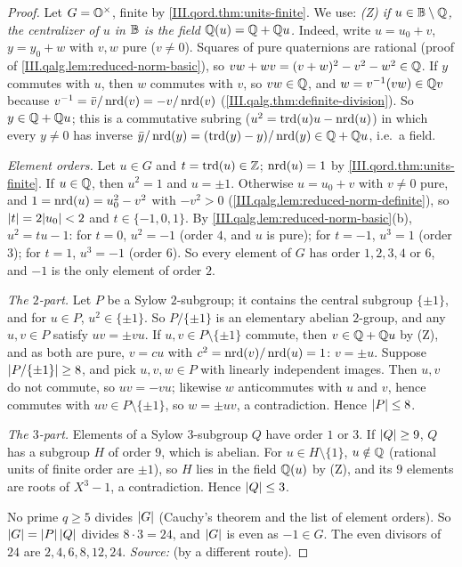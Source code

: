 \begin{theorem}
\end{theorem}
\begin{proof}
Let $G=\mathbb{O}^\times$, finite by \cref{III.qord.thm:units-finite}. We use: \emph{(Z) if $u\in\mathbb{B}\setminus\mathbb{Q}$, the centralizer of $u$ in $\mathbb{B}$ is the field
$\mathbb{Q}(u)=\mathbb{Q}+\mathbb{Q} u$.} Indeed, write $u=u_0+v$, $y=y_0+w$ with $v,w$ pure ($v\ne0$). Squares of pure quaternions are rational (proof of
\cref{III.qalg.lem:reduced-norm-basic}), so $vw+wv=(v+w)^2-v^2-w^2\in\mathbb{Q}$. If $y$ commutes with $u$, then $w$ commutes with $v$, so $vw\in\mathbb{Q}$, and
$w=v^{-1}(vw)\in\mathbb{Q} v$ because $v^{-1}=\bar v/\operatorname{nrd}(v)=-v/\operatorname{nrd}(v)$ (\cref{III.qalg.thm:definite-division}). So $y\in\mathbb{Q}+\mathbb{Q} u$; this is a commutative subring
($u^2=\operatorname{trd}(u)u-\operatorname{nrd}(u)$) in which every $y\ne0$ has inverse $\bar y/\operatorname{nrd}(y)=(\operatorname{trd}(y)-y)/\operatorname{nrd}(y)\in\mathbb{Q}+\mathbb{Q} u$, i.e.\ a field.

\emph{Element orders.} Let $u\in G$ and $t=\operatorname{trd}(u)\in\mathbb{Z}$; $\operatorname{nrd}(u)=1$ by \cref{III.qord.thm:units-finite}. If $u\in\mathbb{Q}$, then $u^2=1$ and $u=\pm1$.
Otherwise $u=u_0+v$ with $v\ne0$ pure, and $1=\operatorname{nrd}(u)=u_0^2-v^2$ with $-v^2>0$ (\cref{III.qalg.lem:reduced-norm-definite}), so $\lvert t\rvert=2\lvert u_0\rvert<2$ and
$t\in\{-1,0,1\}$. By \cref{III.qalg.lem:reduced-norm-basic}(b), $u^2=tu-1$: for $t=0$, $u^2=-1$ (order $4$, and $u$ is pure); for $t=-1$, $u^3=1$ (order
$3$); for $t=1$, $u^3=-1$ (order $6$). So every element of $G$ has order $1,2,3,4$ or $6$, and $-1$ is the only element of order $2$.

\emph{The $2$-part.} Let $P$ be a Sylow $2$-subgroup; it contains the central subgroup $\{\pm1\}$, and for $u\in P$, $u^2\in\{\pm1\}$. So $P/\{\pm1\}$ is
an elementary abelian $2$-group, and any $u,v\in P$ satisfy $uv=\pm vu$. If $u,v\in P\setminus\{\pm1\}$ commute, then $v\in\mathbb{Q}+\mathbb{Q} u$ by (Z), and as both are
pure, $v=cu$ with $c^2=\operatorname{nrd}(v)/\operatorname{nrd}(u)=1$: $v=\pm u$. Suppose $\lvert P/\{\pm1\}\rvert\ge8$, and pick $u,v,w\in P$ with linearly independent images. Then
$u,v$ do not commute, so $uv=-vu$; likewise $w$ anticommutes with $u$ and $v$, hence commutes with $uv\in P\setminus\{\pm1\}$, so $w=\pm uv$, a
contradiction. Hence $\lvert P\rvert\le8$.

\emph{The $3$-part.} Elements of a Sylow $3$-subgroup $Q$ have order $1$ or $3$. If $\lvert Q\rvert\ge9$, $Q$ has a subgroup $H$ of order $9$, which is abelian.
For $u\in H\setminus\{1\}$, $u\notin\mathbb{Q}$ (rational units of finite order are $\pm1$), so $H$ lies in the field $\mathbb{Q}(u)$ by (Z), and its $9$ elements are roots
of $X^3-1$, a contradiction. Hence $\lvert Q\rvert\le3$.

No prime $q\ge5$ divides $\lvert G\rvert$ (Cauchy's theorem and the list of element orders). So $\lvert G\rvert=\lvert P\rvert\,\lvert Q\rvert$ divides $8\cdot3=24$, and $\lvert G\rvert$ is even
as $-1\in G$. The even divisors of $24$ are $2,4,6,8,12,24$. \emph{Source:} \cite[§11.5]{Voi} (by a different route).
\end{proof}

